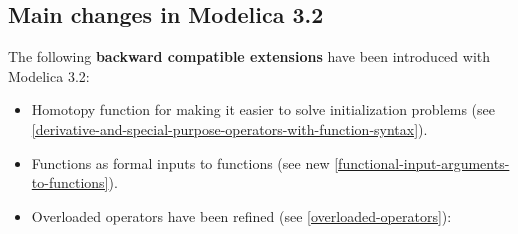 \subsection{Main changes in Modelica 3.2}

The following \textbf{backward compatible extensions} have been
introduced with Modelica 3.2:

\begin{itemize}
\item
  Homotopy function for making it easier to solve initialization
  problems (see \autoref{derivative-and-special-purpose-operators-with-function-syntax}).
\item
  Functions as formal inputs to functions (see new \autoref{functional-input-arguments-to-functions}).
\item
  Overloaded operators have been refined (see \autoref{overloaded-operators}):


\end{itemize}
